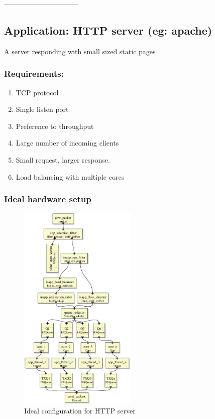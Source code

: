 --------------------------------
\subsection{Application:  HTTP server (eg: apache)}
A server responding with small sized static pages
\subsubsection{Requirements:}
\begin{enumerate}
    \item TCP protocol
    \item Single listen port
    \item Preference to throughput
    \item Large number of incoming clients
    \item Small request, larger response.
    \item Load balancing with multiple cores
\end{enumerate}

\subsubsection{Ideal hardware setup}

\begin{figure}[t]
\centering
\includegraphics[width=0.5\textwidth]{figures/HTTPServerIdeal.eps}
\caption{Ideal configuration for HTTP server}
\end{figure}

